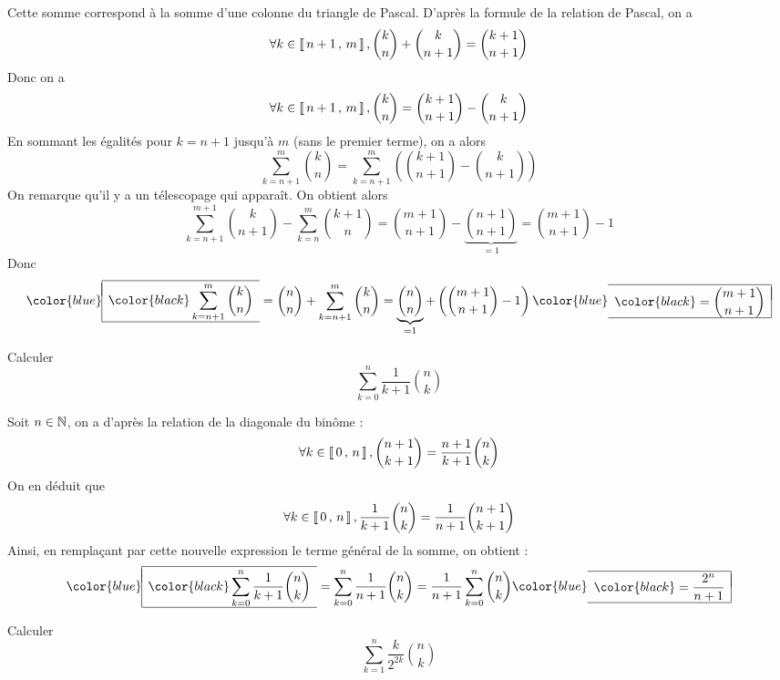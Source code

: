 \documentclass[mathmodern,openany,11pt]{livre}
\newcommand{\lboxed}[1]{{\color{blue}\begin{array}{|l}\hline\\[-2.4ex]{\color{black}#1}\\[1.2ex]\hline\end{array}}}
\newcommand{\rboxed}[1]{{\color{blue}\begin{array}{r|}\hline\\[-2.4ex]{\color{black}#1}\\[1.2ex]\hline\end{array}}}
\begin{document}
\begin{solution}
Cette somme correspond à la somme d'une colonne du triangle de Pascal. D'après la formule de la relation de Pascal, on a 
\[
\forall k \in \left\llbracket \, n+1 \, , \, m \, \right\rrbracket,\binom{k}{n} + \binom{k}{n+1} = \binom{k+1}{n+1} 
\]
Donc on a
\[
\forall k \in \left\llbracket \, n+1 \, , \, m \, \right\rrbracket,\binom{k}{n} = \binom{k+1}{n+1} - \binom{k}{n+1}
\]
En sommant les égalités pour $k=n+1$ jusqu'à $m$ (sans le premier terme), on a alors
\[
\displaystyle\sum\limits_{k=n+1}^{m} \binom{k}{n} 
= \displaystyle\sum\limits_{k=n+1}^{m} \left(\binom{k+1}{n+1} - \binom{k}{n+1}\right)
\]
On remarque qu'il y a un télescopage qui apparaît. On obtient alors
\[
\displaystyle\sum\limits_{k=n+1}^{m+1} \binom{k}{n+1}
- \displaystyle\sum\limits_{k=n}^{m} \binom{k+1}{n}
= \binom{m+1}{n+1} - \underbrace{\binom{n+1}{n+1}}_{=1}
= \binom{m+1}{n+1} - 1
\]
Donc 
\[
\lboxed{\displaystyle\sum\limits_{k=n+1}^{m} \binom{k}{n}}
= \binom{n}{n} + \displaystyle\sum\limits_{k=n+1}^{m} \binom{k}{n} 
= \underbrace{\binom{n}{n}}_{=1} + \left(\binom{m+1}{n+1} - 1\right)
\rboxed{= \displaystyle\binom{m+1}{n+1}}
\]
\end{solution}

\begin{exercice}
Calculer 
\[
\displaystyle\sum\limits_{k=0}^{n} \dfrac{1}{k+1}\binom{n}{k}
\]
\end{exercice}

\begin{solution}
Soit $n \in \mathbb{N}$, on a d'après la relation de la diagonale du binôme :
\[\forall k \in \left\llbracket \, 0 \, , \, n \, \right\rrbracket, \binom{n+1}{k+1} = \dfrac{n+1}{k+1}\binom{n}{k}
\]
On en déduit que
\[
\forall k \in \left\llbracket \, 0 \, , \, n \, \right\rrbracket, \dfrac{1}{k+1}\binom{n}{k} = \dfrac{1}{n+1}\binom{n+1}{k+1}
\]
Ainsi, en remplaçant par cette nouvelle expression le terme général de la somme, on obtient :
\[
\lboxed{\displaystyle\sum\limits_{k=0}^{n} \dfrac{1}{k+1}\binom{n}{k}}
=  \displaystyle\sum\limits_{k=0}^{n} \dfrac{1}{n+1}\binom{n}{k} 
= \dfrac{1}{n+1} \displaystyle\sum\limits_{k=0}^{n} \binom{n}{k}
\rboxed{= \dfrac{2^n}{n+1}}
\]
\end{solution}

\begin{exercice}
Calculer 
\[
\displaystyle\sum\limits_{k=1}^{n} \dfrac{k}{2^{2k}}\binom{n}{k}
\]
\end{exercice}
\end{document}
